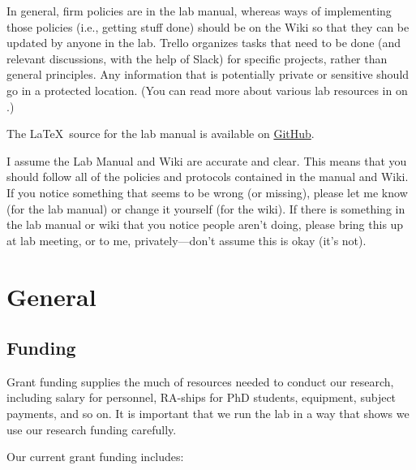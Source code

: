 \documentclass[letterpaper,12pt,oneside]{memoir}
\begin{document}
In general, firm policies are in the lab manual, whereas ways of implementing those policies (i.e., getting stuff done) should be on the Wiki so that they can be updated by anyone in the lab. Trello organizes tasks that need to be done (and relevant discussions, with the help of Slack) for specific projects, rather than general principles. Any information that is potentially private or sensitive should go in a protected location. (You can read more about various lab resources in  on .)

The \LaTeX\ source for the lab manual is available on \href{https://github.com/dvsneuro/smithlab_manual}{GitHub}.

\begin{shaded}
\noindent I assume the Lab Manual and Wiki are accurate and clear. This means that you should follow all of the policies and protocols contained in the manual and Wiki. If you notice something that seems to be wrong (or missing), please let me know (for the lab manual) or change it yourself (for the wiki). If there is something in the lab manual or wiki that you notice people aren't doing, please bring this up at lab meeting, or to me, privately---don't assume this is okay (it's not).
\end{shaded}


\chapter{General} %

\section{Funding}

Grant funding supplies the much of resources needed to conduct our research, including salary for personnel, RA-ships for PhD students, equipment, subject payments, and so on. It is important that we run the lab in a way that shows we use our research funding carefully. 

Our current grant funding includes:
\end{document}
